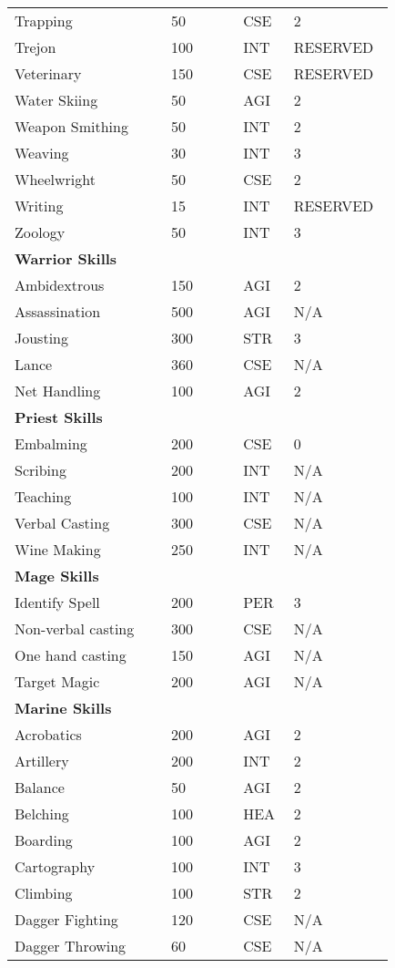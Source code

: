 \documentclass{article}
\begin{document}
\begin{longtable}{@{}p{0.375\linewidth} p{0.178\linewidth} p{0.1\linewidth} p{0.178\linewidth}}
Trapping & 50 & CSE & 2 \\
Trejon & 100 & INT & RESERVED \\
Veterinary & 150 & CSE & RESERVED \\
Water Skiing & 50 & AGI & 2 \\
Weapon Smithing & 50 & INT & 2 \\
Weaving & 30 & INT & 3 \\
Wheelwright & 50 & CSE & 2 \\
Writing & 15 & INT & RESERVED \\
Zoology & 50 & INT & 3 \\
\midrule
\textbf{Warrior Skills} &  &  & \\
Ambidextrous & 150 & AGI & 2 \\
Assassination & 500 & AGI & N/A \\
Jousting & 300 & STR & 3 \\
Lance & 360 & CSE & N/A \\
Net Handling & 100 & AGI & 2 \\
\midrule
\textbf{Priest Skills} &  &  & \\
Embalming & 200 & CSE & 0 \\
Scribing & 200 & INT & N/A \\
Teaching & 100 & INT & N/A \\
Verbal Casting & 300 & CSE & N/A \\
Wine Making & 250 & INT & N/A \\
\midrule
\textbf{Mage Skills} &  &  & \\
Identify Spell & 200 & PER & 3 \\
Non-verbal casting & 300 & CSE & N/A \\
One hand casting & 150 & AGI & N/A \\
Target Magic & 200 & AGI & N/A \\
\midrule
\textbf{Marine Skills} &  &  & \\
Acrobatics & 200 & AGI & 2 \\
Artillery & 200 & INT & 2 \\
Balance & 50 & AGI & 2 \\
Belching & 100 & HEA & 2 \\
Boarding & 100 & AGI & 2 \\
Cartography & 100 & INT & 3 \\
Climbing & 100 & STR & 2 \\
Dagger Fighting & 120 & CSE & N/A \\
Dagger Throwing & 60 & CSE & N/A \\

\end{longtable}
\end{document}
